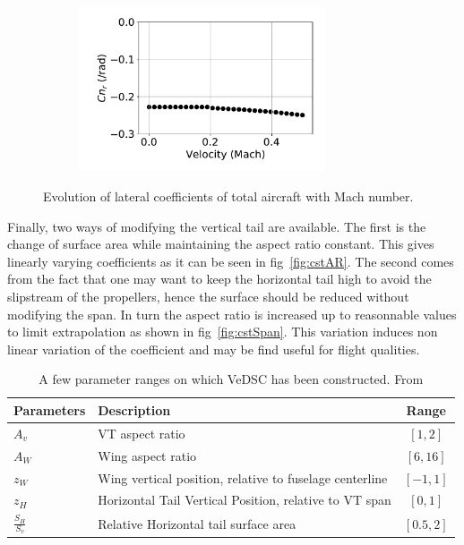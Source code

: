 \begin{figure}[hbt]
\begin{subfigure}[b]{0.49\textwidth}
		\caption{}
		\label{fig:CnbetaMachChange}
	\end{subfigure}
	\begin{subfigure}[b]{0.49\textwidth}
		\includegraphics[width=0.8\textwidth]{CnrMachChange}
		\caption{}
		\label{fig:CnrMachChange}
	\end{subfigure}
	\caption{Evolution of lateral coefficients of total aircraft with Mach number.}\label{fig:MachVariation}
\end{figure}

Finally, two ways of modifying the vertical tail are available. The first is the change of surface area while maintaining the aspect ratio constant. This gives linearly varying coefficients as it can be seen in fig~\ref{fig:cstAR}. The second comes from the fact that one may want to keep the horizontal tail high to avoid the slipstream of the propellers, hence the surface should be reduced without modifying the span. In turn the aspect ratio is increased up to reasonnable values to limit extrapolation as shown in fig~\ref{fig:cstSpan}. This variation induces non linear variation of the coefficient and may be find useful for flight qualities.

\begin{table}[hbt]
	\caption{\label{tab:VeDSCParam} A few parameter ranges on which VeDSC has been constructed. From \cite{NicolosiNewApproach}} 
	\centering
	\begin{tabular}{l|l|c}
		Parameters & Description & Range\\
		\hline
		$A_v$ & VT aspect ratio & $\left[1,2\right]$\\
		$A_W$ & Wing aspect ratio & $\left[6,16\right]$\\
		$z_W$ & Wing vertical position, relative to fuselage centerline & $\left[-1,1\right]$ \\
		$z_H$ & Horizontal Tail Vertical Position, relative to VT span & $\left[0,1\right]$\\
		$\frac{S_H}{S_v}$ & Relative Horizontal tail surface area & $\left[0.5,2\right]$
	\end{tabular}
\end{table}